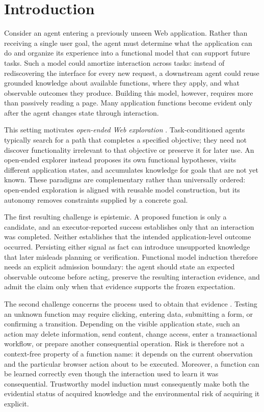 \section{Introduction}
\label{sec:introduction}

Consider an agent entering a previously unseen Web application. Rather than
receiving a single user goal, the agent must determine what the application
can do and organize its experience into a functional model that can support
future tasks. Such a model could amortize interaction across tasks: instead of
rediscovering the interface for every new request, a downstream agent could
reuse grounded knowledge about available functions, where they apply, and what
observable outcomes they produce. Building this model, however, requires more
than passively reading a page. Many application functions become evident only
after the agent changes state through interaction.

This setting motivates \emph{open-ended Web exploration}
\citep{xie2025guiexplorer,nica2025uiexplore,fan2025guibee}. Task-conditioned
agents typically search for a path that completes a specified objective; they
need not discover functionality irrelevant to that objective or preserve it
for later use. An open-ended explorer instead proposes its own functional
hypotheses, visits different application states, and accumulates knowledge for
goals that are not yet known. These paradigms are complementary rather than
universally ordered: open-ended exploration is aligned with reusable model
construction, but its autonomy removes constraints supplied by a concrete goal.

The first resulting challenge is epistemic. A proposed function is only a
candidate, and an executor-reported success establishes only that an
interaction was completed. Neither establishes that the intended
application-level outcome occurred. Persisting either signal as fact can
introduce unsupported knowledge that later misleads planning or verification.
Functional model induction therefore needs an explicit admission boundary:
the agent should state an expected observable outcome before acting, preserve
the resulting interaction evidence, and admit the claim only when that
evidence supports the frozen expectation.

The second challenge concerns the process used to obtain that evidence
\citep{zheng2025webguard,sun2026ossentinel,mohammadmirzaei2026osguard}.
Testing an unknown function may require clicking, entering data, submitting a
form, or confirming a transition. Depending on the visible application state,
such an action may delete information, send content, change access, enter a
transactional workflow, or prepare another consequential operation. Risk is
therefore not a context-free property of a function name: it depends on the
current observation and the particular browser action about to be executed.
Moreover, a function can be learned correctly even though the interaction used
to learn it was consequential. Trustworthy model induction must consequently
make both the evidential status of acquired knowledge and the environmental
risk of acquiring it explicit.

